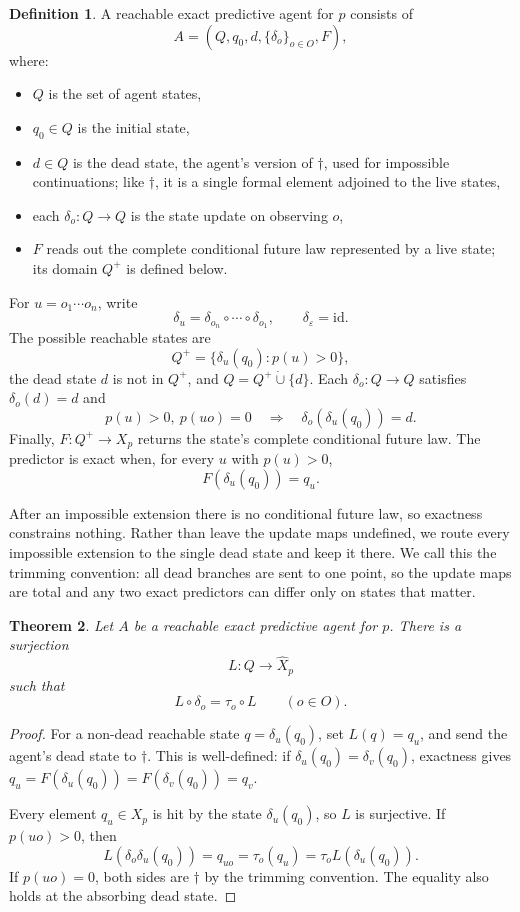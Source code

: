\documentclass[10pt]{article}
\newtheorem{theorem}{Theorem}[section]
\theoremstyle{definition}
\newtheorem{definition}[theorem]{Definition}
\theoremstyle{remark}
\newcommand{\Obs}{O}
\newcommand{\eps}{\varepsilon}
\newcommand{\id}{\mathrm{id}}
\begin{document}
\begin{definition}
A reachable exact predictive agent for $p$ consists of
\[
  A=(Q,q_0,d,\{\delta_o\}_{o\in\Obs},F),
\]
where:
\begin{itemize}
  \item $Q$ is the set of agent states,
  \item $q_0\in Q$ is the initial state,
  \item $d\in Q$ is the dead state, the agent's version of
        $\dagger$, used for impossible continuations; like $\dagger$, it is a single formal element adjoined to the live states,
  \item each $\delta_o:Q\to Q$ is the state update on observing $o$,
  \item $F$ reads out the complete conditional future law
        represented by a live state; its domain $Q^+$ is
        defined below.
\end{itemize}


For $u=o_1\cdots o_n$, write
\[
  \delta_u=\delta_{o_n}\circ\cdots\circ\delta_{o_1},
  \qquad \delta_\eps=\id.
\]
The possible reachable states are
\[
  Q^+=\{\delta_u(q_0):p(u)>0\},
\]
the dead state $d$ is not in $Q^+$, and
$Q=Q^+\mathbin{\dot\cup}\{d\}$.  Each $\delta_o:Q\to Q$ satisfies
$\delta_o(d)=d$ and
\[
  p(u)>0,\ p(uo)=0
  \quad\Longrightarrow\quad
  \delta_o(\delta_u(q_0))=d.
\]
Finally, $F:Q^+\to X_p$ returns the state's complete conditional future law.
The predictor is exact when, for every $u$ with $p(u)>0$,
\[
  F(\delta_u(q_0))=q_u.
\]
\end{definition}

After an impossible extension there is no conditional future law, 
so exactness constrains nothing. Rather than leave the update maps undefined, we route every impossible extension to the 
single dead state and keep it there. 
We call this the trimming convention: all dead branches are sent to one point, 
so the update maps are total and any two exact predictors can differ only on states that matter.


\begin{theorem}
\label{thm:predictor-quotient}
Let $A$ be a reachable exact predictive agent for $p$.  There is a surjection
\[
  L:Q\rightarrow\widehat X_p
\]
such that
\[
  L\circ\delta_o=\tau_o\circ L
  \qquad(o\in\Obs).
\]
\end{theorem}

\begin{proof}
For a non-dead reachable state $q=\delta_u(q_0)$, set $L(q)=q_u$, and send the
agent's dead state to $\dagger$.  This is well-defined: if
$\delta_u(q_0)=\delta_v(q_0)$, exactness gives
$q_u=F(\delta_u(q_0))=F(\delta_v(q_0))=q_v$.

Every element $q_u\in X_p$ is hit by the state $\delta_u(q_0)$, so $L$ is
surjective.  If $p(uo)>0$, then
\[
  L(\delta_o\delta_u(q_0))=q_{uo}
  =\tau_o(q_u)=\tau_oL(\delta_u(q_0)).
\]
If $p(uo)=0$, both sides are $\dagger$ by the trimming convention.  The equality
also holds at the absorbing dead state.
\end{proof}
\end{document}
